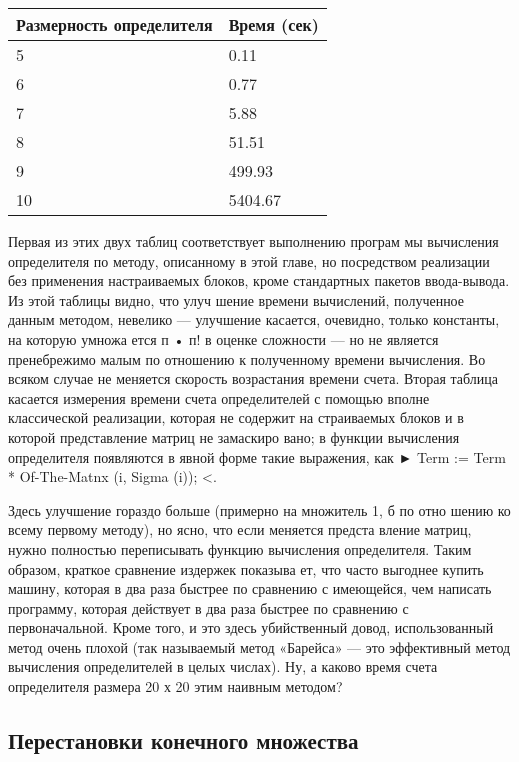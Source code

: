 {\begin{multicols}{2}
\columnbreak

\begin{tabular}{|p{2.75cm}|p{2.75cm}|}
\hline
Размерность определителя & Время  (сек) \\ \hline
5 & 0.11 \\
6 & 0.77 \\
7 & 5.88 \\
8 & 51.51 \\
9 & 499.93 \\
10 & 5404.67 \\ \hline
\end{tabular}
\end{multicols}

Первая из этих двух таблиц соответствует выполнению програм­
мы вычисления определителя по методу, описанному в этой главе, но
посредством реализации без применения настраиваемых блоков, кроме
стандартных пакетов ввода-вывода. Из этой таблицы видно, что улуч­
шение времени вычислений, полученное данным методом, невелико —
улучшение касается, очевидно, только константы, на которую умножа­
ется п • п! в оценке сложности — но не является пренебрежимо малым
по отношению к полученному времени вычисления. Во всяком случае
не меняется скорость возрастания времени счета.
Вторая таблица касается измерения времени счета определителей
с помощью вполне классической реализации, которая не содержит на­
страиваемых блоков и в которой представление матриц не замаскиро­
вано; в функции вычисления определителя появляются в явной форме
такие выражения, как ► Term := Term * Of-The-Matnx (i, Sigma (i)); <.

\newpage

Здесь улучшение гораздо больше (примерно на множитель 1, б по отно­
шению ко всему первому методу), но ясно, что если меняется предста­
вление матриц, нужно полностью переписывать функцию вычисления
определителя. Таким образом, краткое сравнение издержек показыва­
ет, что часто выгоднее купить машину, которая в два раза быстрее по
сравнению с имеющейся, чем написать программу, которая действует
в два раза быстрее по сравнению с первоначальной. Кроме того, и это
здесь убийственный довод, использованный метод очень плохой (так
называемый метод «Барейса» — это эффективный метод вычисления
определителей в целых числах).
Ну, а каково время счета определителя размера 20 х 20 этим наивным
методом?

\subsection{Перестановки конечного множества}

}
